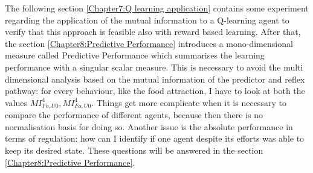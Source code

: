 The following section \ref{Chapter7:Q learning application} contains some experiment
regarding the application of the mutual information to a Q-learning agent to
verify that this approach is feasible also with reward based learning.
After that, the section \ref{Chapter8:Predictive Performance} introduces a mono-dimensional
measure called Predictive Performance which summarises the learning performance
with a singular scalar measure.
This is necessary to avoid the multi dimensional analysis based on the mutual information
of the predictor and reflex pathway: for every behaviour, like the food attraction,
I have to look at both the values $MI^4_{Fo,U0},MI^4_{Fo,U0}$.
Things get more complicate when it is necessary to compare the performance of 
different agents, because then there is no normalisation basis for doing so.
Another issue is the absolute performance in terms of regulation: how can I identify
if one agent despite its efforts was able to keep its desired state.
These questions will be answered in the section \ref{Chapter8:Predictive Performance}. 



